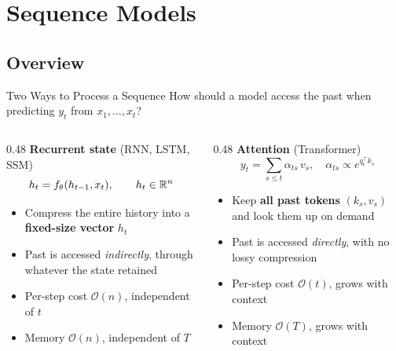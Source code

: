 
\section{Sequence Models}

\subsection{Overview}

\begin{frame}{Two Ways to Process a Sequence}
  How should a model access the past when predicting $y_t$ from $x_1, \ldots, x_t$?

  \vspace{0.5em}
  \begin{columns}[T]
    \begin{column}{0.48\textwidth}
      \textbf{Recurrent state} (RNN, LSTM, SSM)
      \[
        h_t = f_\theta(h_{t-1}, x_t), \qquad h_t \in \mathbb{R}^n
      \]
      \begin{itemize}
        \item Compress the entire history into a \textbf{fixed-size vector} $h_t$
        \item Past is accessed \emph{indirectly}, through whatever the state retained
        \item Per-step cost $\mathcal{O}(n)$, independent of $t$
        \item Memory $\mathcal{O}(n)$, independent of $T$
      \end{itemize}
    \end{column}
    \begin{column}{0.48\textwidth}
      \textbf{Attention} (Transformer)
      \[
        y_t = \sum_{s \le t} \alpha_{ts}\, v_s, \quad \alpha_{ts} \propto e^{q_t^\top k_s}
      \]
      \begin{itemize}
        \item Keep \textbf{all past tokens} $(k_s, v_s)$ and look them up on demand
        \item Past is accessed \emph{directly}, with no lossy compression
        \item Per-step cost $\mathcal{O}(t)$, grows with context
        \item Memory $\mathcal{O}(T)$, grows with context
      \end{itemize}
    \end{column}
  \end{columns}


\end{frame}

